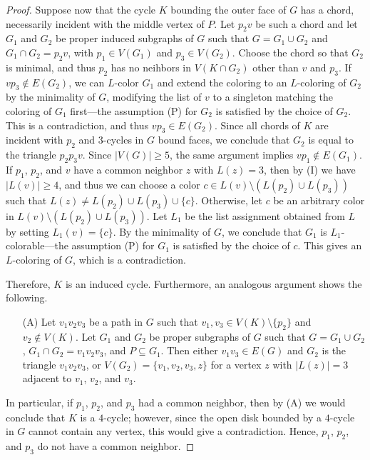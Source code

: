 \documentclass[12pt,twoside,openright,a4paper]{book}
\begin{document}
\begin{proof}
Suppose now that the cycle $K$ bounding the outer face of $G$ has a chord, necessarily incident with the middle vertex of $P$.
Let $p_2v$ be such a chord and let $G_1$ and $G_2$ be proper induced subgraphs of $G$ such that $G=G_1\cup G_2$ and $G_1\cap G_2=p_2v$,
with $p_1\in V(G_1)$ and $p_3\in V(G_2)$.  Choose the chord so that $G_2$ is minimal, and thus $p_2$ has no neihbors in $V(K\cap G_2)$
other than $v$ and $p_3$.  If $vp_3\not\in E(G_2)$, we can $L$-color $G_1$ and extend the coloring to an $L$-coloring of $G_2$
by the minimality of $G$, modifying the list of $v$ to a singleton matching the coloring of $G_1$ first---the assumption (P)
for $G_2$ is satisfied by the choice of $G_2$.  This is a contradiction, and thus $vp_3\in E(G_2)$.  Since all chords of $K$
are incident with $p_2$ and $3$-cycles in $G$ bound faces, we conclude that $G_2$ is equal to the triangle $p_2p_3v$.
Since $|V(G)|\ge 5$, the same argument implies $vp_1\not\in E(G_1)$.  If $p_1$, $p_2$, and $v$ have a common neighbor $z$ with $L(z)=3$,
then by (I) we have $|L(v)|\ge 4$, and thus we can choose a color $c\in L(v)\setminus (L(p_2)\cup L(p_3))$ such that $L(z)\neq L(p_2)\cup L(p_3)\cup \{c\}$.
Otherwise, let $c$ be an arbitrary color in $L(v)\setminus (L(p_2)\cup L(p_3))$.  Let $L_1$ be the list assignment obtained from
$L$ by setting $L_1(v)=\{c\}$.  By the minimality of $G$, we conclude that $G_1$ is $L_1$-colorable---the assumption (P) for $G_1$
is satisfied by the choice of $c$.  This gives an $L$-coloring of $G$, which is a contradiction.

Therefore, $K$ is an induced cycle.  Furthermore, an analogous argument shows the following.
\begin{itemize}
\item[(A)] Let $v_1v_2v_3$ be a path in $G$ such that $v_1,v_3\in V(K)\setminus\{p_2\}$ and $v_2\not\in V(K)$.
Let $G_1$ and $G_2$ be proper subgraphs of $G$ such that $G=G_1\cup G_2$, $G_1\cap G_2=v_1v_2v_3$, and $P\subseteq G_1$.
Then either $v_1v_3\in E(G)$ and $G_2$ is the triangle $v_1v_2v_3$, or $V(G_2)=\{v_1,v_2,v_3,z\}$ for a vertex $z$
with $|L(z)|=3$ adjacent to $v_1$, $v_2$, and $v_3$.
\end{itemize}
In particular, if $p_1$, $p_2$, and $p_3$ had a common neighbor, then by (A) we would conclude that $K$ is a $4$-cycle;
however, since the open disk bounded by a $4$-cycle in $G$ cannot contain any vertex, this would give a contradiction.
Hence, $p_1$, $p_2$, and $p_3$ do not have a common neighbor.


\end{proof}
\end{document}
